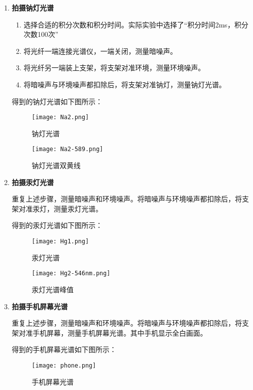 \documentclass[dvipsnames, svgnames,a4paper,11pt]{article}
\begin{document}
		\begin{enumerate}
			\item \textbf{拍摄钠灯光谱}
				\begin{enumerate}
					\item 选择合适的积分次数和积分时间。实际实验中选择了“积分时间2ms，积分次数100次”
					
					\item 将光纤一端连接光谱仪，一端关闭，测量暗噪声。 
					
					\item 将光纤另一端装上支架，将支架对准环境，测量环境噪声。
					
					\item 将暗噪声与环境噪声都扣除后，将支架对准钠灯，测量钠灯光谱。
					
				\end{enumerate}
				
				得到的钠灯光谱如下图所示：
				
				\begin{figure}[htbp]
					\centering
					\texttt{[image: Na2.png]}
					\caption{钠灯光谱}
					\label{fig:Na2}
				\end{figure}
				
				\begin{figure}[htbp]
					\centering
					\texttt{[image: Na2-589.png]}
					\caption{钠灯光谱双黄线}
					\label{fig:Na2-589}
				\end{figure}
				
			\item \textbf{拍摄汞灯光谱}
			
				重复上述步骤，测量暗噪声和环境噪声。将暗噪声与环境噪声都扣除后，将支架对准汞灯，测量汞灯光谱。
				
				
				得到的汞灯光谱如下图所示：
				
				\begin{figure}[htbp]
					\centering
					\texttt{[image: Hg1.png]}
					\caption{汞灯光谱}
					\label{fig:Hg1}
				\end{figure}
				
				\begin{figure}[htbp]
					\centering
					\texttt{[image: Hg2-546nm.png]}
					\caption{汞灯光谱峰值}
					\label{fig:Hg2-546}
				\end{figure}
				
			\item \textbf{拍摄手机屏幕光谱}
			
				重复上述步骤，测量暗噪声和环境噪声。将暗噪声与环境噪声都扣除后，将支架对准手机屏幕，测量手机屏幕光谱。其中手机显示全白画面。
				
				得到的手机屏幕光谱如下图所示：
				
				\begin{figure}[htbp]
					\centering
					\texttt{[image: phone.png]}
					\caption{手机屏幕光谱}
					\label{fig:phone}
				\end{figure}
		\end{enumerate}
		
\end{document}
